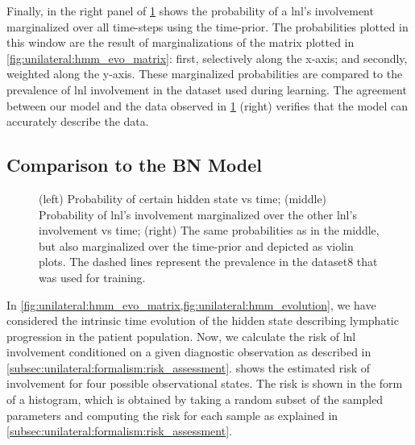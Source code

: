 \documentclass[\relativeRoot/main.tex]{subfiles}
\begin{document}
Finally, in the right panel of \cref{fig:unilateral:hmm_evolution} shows the probability of a \gls{lnl}'s involvement marginalized over all time-steps using the time-prior. The probabilities plotted in this window are the result of marginalizations of the matrix plotted in \cref{fig:unilateral:hmm_evo_matrix}: first, selectively along the x-axis; and secondly, weighted along the y-axis. These marginalized probabilities are compared to the prevalence of \gls{lnl} involvement in the dataset used during learning. The agreement between our model and the data observed in \cref{fig:unilateral:hmm_evolution} (right) verifies that the model can accurately describe the data.

\subsection{Comparison to the BN Model}
\label{subsec:unilateral:application:comp_to_bn}

\begin{figure}
    \centering
    \def\svgwidth{1.01\textwidth}
    
    \caption[Evolution of probabilities to find the unilateral system in some selected states]{(left) Probability of certain hidden state vs time; (middle) Probability of \gls{lnl}'s involvement marginalized over the other \gls{lnl}'s involvement vs time; (right) The same probabilities as in the middle, but also marginalized over the time-prior and depicted as violin plots. The dashed lines represent the prevalence in the dataset8 that was used for training.}
    \label{fig:unilateral:hmm_evolution}
\end{figure}

In \cref{fig:unilateral:hmm_evo_matrix,fig:unilateral:hmm_evolution}, we have considered the intrinsic time evolution of the hidden state describing lymphatic progression in the patient population. Now, we calculate the risk of \gls{lnl} involvement conditioned on a given diagnostic observation as described in \cref{subsec:unilateral:formalism:risk_assessment}.  shows the estimated risk of involvement for four possible observational states. The risk is shown in the form of a histogram, which is obtained by taking a random subset of the sampled parameters and computing the risk for each sample as explained in \cref{subsec:unilateral:formalism:risk_assessment}.
\end{document}
